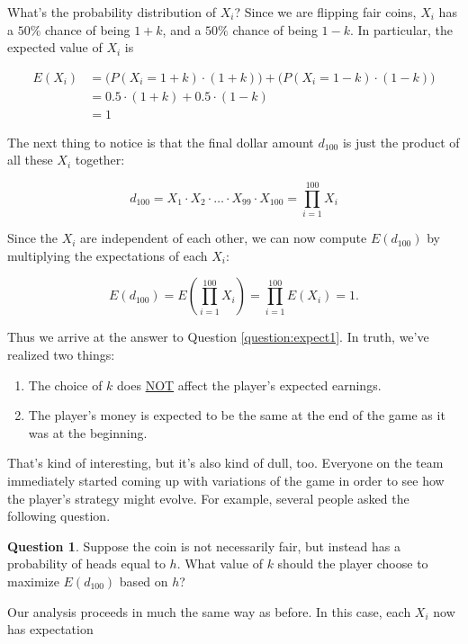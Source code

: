 \documentclass[12pt, oneside]{book}
\theoremstyle{plain}
\theoremstyle{definition}
\newtheorem{question}[thm]{Question}
\begin{document}
What's the probability distribution of $X_i$? Since we are flipping fair coins, $X_i$ has a $50\%$ chance of being $1+k$, and a $50\%$ chance of being $1-k$. In particular, the expected value of $X_i$ is

\begin{align*}
E(X_i) & = \bigg ( P(X_i = 1+k) \cdot (1+k) \bigg ) + \bigg ( P(X_i = 1-k) \cdot (1-k) \bigg ) \\
& = 0.5 \cdot (1+k) + 0.5 \cdot (1-k)\\
& = 1
\end{align*}

\noindent The next thing to notice is that the final dollar amount $d_{100}$ is just the product of all these $X_i$ together:

\[
d_{100} = X_1 \cdot X_2 \cdot \ldots \cdot X_{99} \cdot X_{100} = \prod_{i=1}^{100} X_i
\]

\noindent Since the $X_i$ are independent of each other, we can now compute $E(d_{100})$ by multiplying the expectations of each $X_i$:

\begin{equation}\label{eqn:expect1}
E(d_{100}) = E \left ( \prod_{i=1}^{100} X_i \right ) = \prod_{i=1}^{100} E(X_i) = 1.
\end{equation}

\noindent Thus we arrive at the answer to Question \ref{question:expect1}. In truth, we've realized two things:

\begin{enumerate}
\item The choice of $k$ does \underline{NOT} affect the player's expected earnings.
\item The player's money is expected to be the same at the end of the game as it was at the beginning.
\end{enumerate}

That's kind of interesting, but it's also kind of dull, too. Everyone on the team immediately started coming up with variations of the game in order to see how the player's strategy might evolve. For example, several people asked the following question.

\begin{question}
Suppose the coin is not necessarily fair, but instead has a probability of heads equal to $h$. What value of $k$ should the player choose to maximize $E(d_{100})$ based on $h$?
\end{question}

Our analysis proceeds in much the same way as before. In this case, each $X_i$ now has expectation
\end{document}
